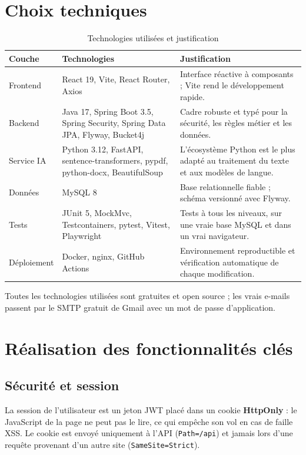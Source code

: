 \documentclass[12pt,a4paper]{report}
\newcommand{\thead}[1]{\textbf{#1}}
\begin{document}
\section{Choix techniques}

\begin{table}[H]
\centering\small
\begin{tabularx}{\textwidth}{|p{2.7cm}|p{4.8cm}|L|}
\hline
{}\thead{Couche} & \thead{Technologies} & \thead{Justification} \\ \hline
Frontend & React 19, Vite, React Router, Axios \cite{react} & Interface réactive à composants ; Vite rend le développement rapide. \\ \hline
Backend & Java 17, Spring Boot 3.5, Spring Security, Spring Data JPA, Flyway, Bucket4j \cite{springboot} & Cadre robuste et typé pour la sécurité, les règles métier et les données. \\ \hline
Service IA & Python 3.12, FastAPI, sentence-transformers, pypdf, python-docx, BeautifulSoup \cite{fastapi,sbert} & L'écosystème Python est le plus adapté au traitement du texte et aux modèles de langue. \\ \hline
Données & MySQL 8 & Base relationnelle fiable ; schéma versionné avec Flyway. \\ \hline
Tests & JUnit 5, MockMvc, Testcontainers, pytest, Vitest, Playwright \cite{playwright} & Tests à tous les niveaux, sur une vraie base MySQL et dans un vrai navigateur. \\ \hline
Déploiement & Docker, nginx, GitHub Actions & Environnement reproductible et vérification automatique de chaque modification. \\ \hline
\end{tabularx}
\caption{Technologies utilisées et justification}
\end{table}

Toutes les technologies utilisées sont gratuites et open source ; les vrais e-mails passent par le SMTP gratuit de Gmail avec un mot de passe d'application.

\section{Réalisation des fonctionnalités clés}

\subsection{Sécurité et session}
La session de l'utilisateur est un jeton JWT placé dans un cookie \textbf{HttpOnly} : le JavaScript de la page ne peut pas le lire, ce qui empêche son vol en cas de faille XSS. Le cookie est envoyé uniquement à l'API (\texttt{Path=/api}) et jamais lors d'une requête provenant d'un autre site (\texttt{SameSite=Strict}).
\end{document}
